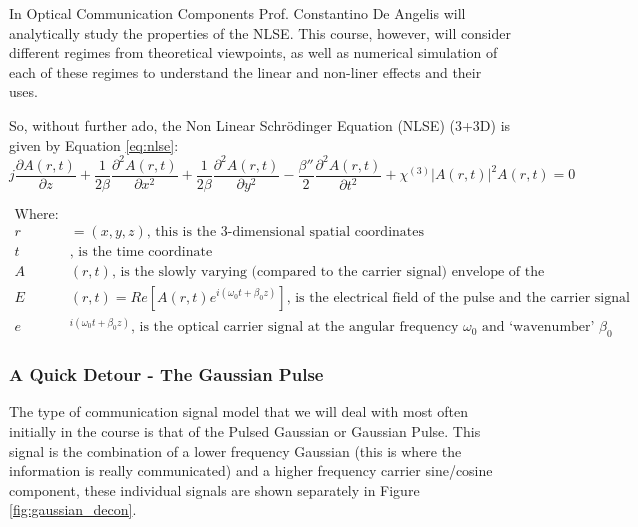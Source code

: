 \documentclass[colorlinks,11pt,a4paper,normalphoto,withhyper,ragged2e]{altareport}
\begin{document}
	In Optical Communication Components Prof. Constantino De Angelis will analytically study the properties of the NLSE. This course, however, will consider different regimes from theoretical viewpoints, as well as numerical simulation of each of these regimes to understand the linear and non-liner effects and their uses. \linebreak
	
	So, without further ado, the Non Linear Schr\"{o}dinger Equation (NLSE) (3+3D) is given by Equation \ref{eq:nlse}:
	\begin{equation} \label{eq:nlse}
       j \frac{\partial A(r,t)}{\partial z} + \frac{1}{2 \beta} \frac{\partial^2 A(r,t)}{\partial x^2} + \frac{1}{2 \beta} \frac{\partial^2 A(r,t)}{\partial y^2} - \frac{ \beta ''}{2} \frac{\partial^2 A(r,t)}{\partial t^2} + \chi^{(3)} |A(r,t)|^2 A(r,t) = 0
	\end{equation}
	
	\begin{align}
		\text{Where:}& \nonumber\\
		r & = (x, y, z) \text{, this is the 3-dimensional spatial coordinates} \nonumber\\
		t & \text{, is the time coordinate} \nonumber\\
		A & (r,t) \text{, is the slowly varying (compared to the carrier signal) envelope of the signal} \nonumber\\
		E & (r,t) = Re[A(r,t) e^{i(\omega_0t + \beta_0z)}] \text{, is the electrical field of the pulse and the carrier signal} \nonumber\\
		e&^{{i(\omega_0t + \beta_0z)}} \text{, is the optical carrier signal at the angular frequency } \omega_0 \text{ and `wavenumber' } \beta_0 \nonumber
	\end{align}
	
	
	\pagebreak
	
	
	\subsubsection{A Quick Detour - The Gaussian Pulse}
	The type of communication signal model that we will deal with most often initially in the course is that of the Pulsed Gaussian or Gaussian Pulse. This signal is the combination of a lower frequency Gaussian (this is where the information is really communicated) and a higher frequency carrier sine/cosine component, these individual signals are shown separately in Figure \ref{fig:gaussian_decon}. \linebreak
	
\end{document}
